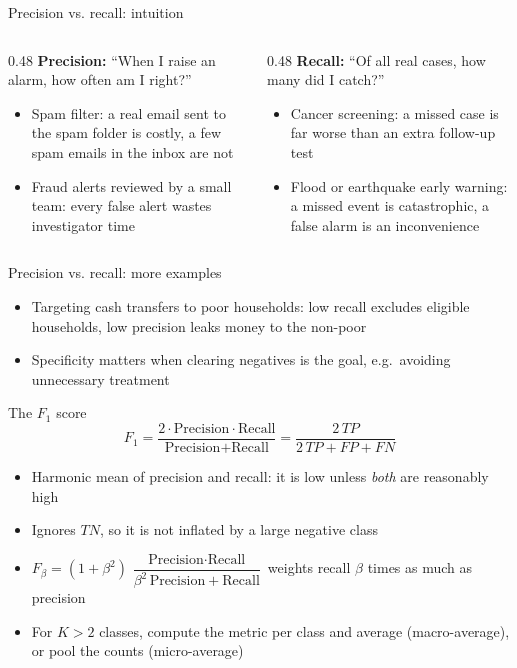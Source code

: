 \begin{frame}{Precision vs. recall: intuition}
    \begin{columns}[T]
        \begin{column}{0.48\textwidth}
            \textbf{Precision:} ``When I raise an alarm, how often am I right?''
            \begin{itemize}
                \item Spam filter: a real email sent to the spam folder is costly, a few spam emails in the inbox are not
                \item Fraud alerts reviewed by a small team: every false alert wastes investigator time
            \end{itemize}
        \end{column}
        \begin{column}{0.48\textwidth}
            \textbf{Recall:} ``Of all real cases, how many did I catch?''
            \begin{itemize}
                \item Cancer screening: a missed case is far worse than an extra follow-up test
                \item Flood or earthquake early warning: a missed event is catastrophic, a false alarm is an inconvenience
            \end{itemize}
        \end{column}
    \end{columns}
\end{frame}


\begin{frame}{Precision vs. recall: more examples}
    \begin{itemize}
        \item Targeting cash transfers to poor households: low recall excludes eligible households, low precision leaks money to the non-poor
        \item Specificity matters when clearing negatives is the goal, e.g.\ avoiding unnecessary treatment
    \end{itemize}
\end{frame}


\begin{frame}{The $F_1$ score}
    \[
        F_1 = \frac{2\cdot\text{Precision}\cdot\text{Recall}}{\text{Precision} + \text{Recall}} = \frac{2\,TP}{2\,TP + FP + FN}
    \]
    \begin{itemize}
        \item Harmonic mean of precision and recall: it is low unless \emph{both} are reasonably high
        \item Ignores $TN$, so it is not inflated by a large negative class
        \item $F_\beta = (1 + \beta^2)\,\dfrac{\text{Precision}\cdot\text{Recall}}{\beta^2\,\text{Precision} + \text{Recall}}$ weights recall $\beta$ times as much as precision
        \item For $K > 2$ classes, compute the metric per class and average (macro-average), or pool the counts (micro-average)
    \end{itemize}
\end{frame}


